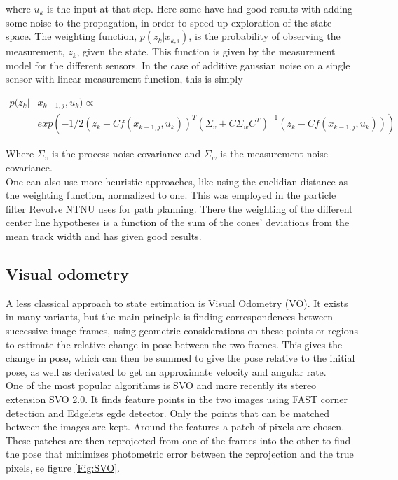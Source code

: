 where $u_k$ is the input at that step. Here some have had good results with adding some noise to the propagation, in order to speed up exploration of the state space\cite{ParticleNoise}. The weighting function, $p(z_k|x_{k,i})$, is the probability of observing the measurement, $z_k$, given the state. This function is given by the measurement model for the different sensors. In the case of additive gaussian noise on a single sensor with linear measurement function, this is simply

\begin{align}
    p(z_k| & x_{k-1, j}, u_k) \propto \\
    & exp(-1/2(z_k - Cf(x_{k-1, j}, u_k))^T
    (\Sigma_v + C\Sigma_wC^T)^{-1}(z_k - Cf(x_{k-1, j}, u_k))) \nonumber
\end{align}

Where $\Sigma_v$ is the process noise covariance and $\Sigma_w$ is the measurement noise covariance. \\ 

One can also use more heuristic approaches, like using the euclidian distance as the weighting function, normalized to one. This was employed in the particle filter Revolve NTNU uses for path planning. There the weighting of the different center line hypotheses is a function of the sum of the cones' deviations from the mean track width and has given good results.

\subsection{Visual odometry}

A less classical approach to state estimation is Visual Odometry (VO). It exists in many variants, but the main principle is finding correspondences between successive image frames, using geometric considerations on these points or regions to estimate the relative change in pose between the two frames. This gives the change in pose, which can then be summed to give the pose relative to the initial pose, as well as derivated to get an approximate velocity and angular rate.\\ 

One of the most popular algorithms is SVO\cite{SVO} and more recently its stereo extension SVO 2.0\cite{SVO2}. It finds feature points in the two images using FAST corner detection\cite{FAST} and Edgelets egde detector\cite{Edgelet}. Only the points that can be matched between the images are kept. Around the features a patch of pixels are chosen. These patches are then reprojected from one of the frames into the other to find the pose that minimizes photometric error between the reprojection and the true pixels, se figure \ref{Fig:SVO}. \\


